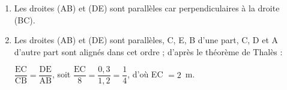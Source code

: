 
\medskip

%
%
%

\begin{enumerate}
\item %
Les droites (AB) et (DE) sont parallèles car perpendiculaires à la droite (BC).
\item %
Les droites  (AB) et (DE) sont parallèles, C, E, B d’une part, C, D et A d’autre part sont alignés dans cet ordre ; d’après le théorème de Thalès :

$\dfrac{\text{EC}}{\text{CB}} = \dfrac{\text{DE}}{\text{AB}}$, soit $\dfrac{\text{EC}}{8} = \dfrac{0,3}{1,2} = \dfrac{1}{4}$, d’où EC $ = 2$~m. 
\end{enumerate}

